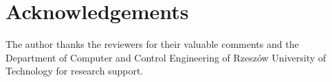 \section*{Acknowledgements}
\label{sec:acknowledgements}

The author thanks the reviewers for their valuable comments and the Department of Computer and Control Engineering of Rzesz\'ow University of Technology for research support.

